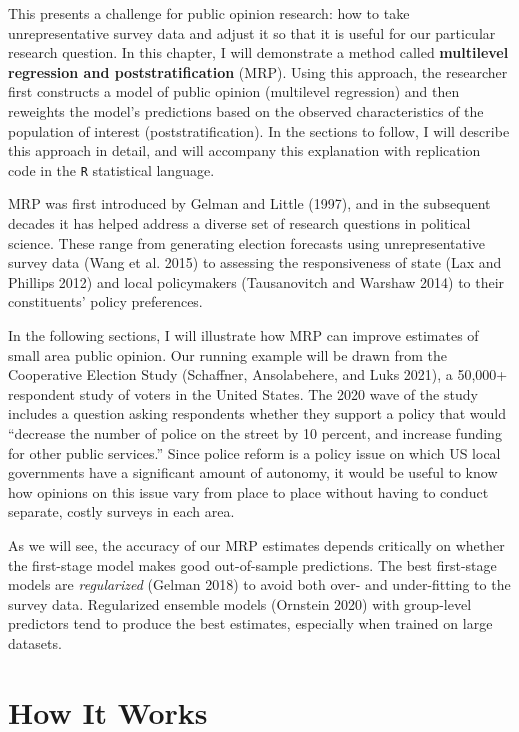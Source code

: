 \documentclass[
]{article}
\begin{document}
This presents a challenge for public opinion research: how to take
unrepresentative survey data and adjust it so that it is useful for our
particular research question. In this chapter, I will demonstrate a
method called \textbf{multilevel regression and poststratification}
(MRP). Using this approach, the researcher first constructs a model of
public opinion (multilevel regression) and then reweights the model's
predictions based on the observed characteristics of the population of
interest (poststratification). In the sections to follow, I will
describe this approach in detail, and will accompany this explanation
with replication code in the \texttt{R} statistical language.

MRP was first introduced by Gelman and Little (1997), and in the
subsequent decades it has helped address a diverse set of research
questions in political science. These range from generating election
forecasts using unrepresentative survey data (Wang et al. 2015) to
assessing the responsiveness of state (Lax and Phillips 2012) and local
policymakers (Tausanovitch and Warshaw 2014) to their constituents'
policy preferences.

In the following sections, I will illustrate how MRP can improve
estimates of small area public opinion. Our running example will be
drawn from the Cooperative Election Study (Schaffner, Ansolabehere, and
Luks 2021), a 50,000+ respondent study of voters in the United States.
The 2020 wave of the study includes a question asking respondents
whether they support a policy that would ``decrease the number of police
on the street by 10 percent, and increase funding for other public
services.'' Since police reform is a policy issue on which US local
governments have a significant amount of autonomy, it would be useful to
know how opinions on this issue vary from place to place without having
to conduct separate, costly surveys in each area.

As we will see, the accuracy of our MRP estimates depends critically on
whether the first-stage model makes good out-of-sample predictions. The
best first-stage models are \emph{regularized} (Gelman 2018) to avoid
both over- and under-fitting to the survey data. Regularized ensemble
models (Ornstein 2020) with group-level predictors tend to produce the
best estimates, especially when trained on large datasets.

\hypertarget{how-it-works}{%
\section{How It Works}\label{how-it-works}}
\end{document}
